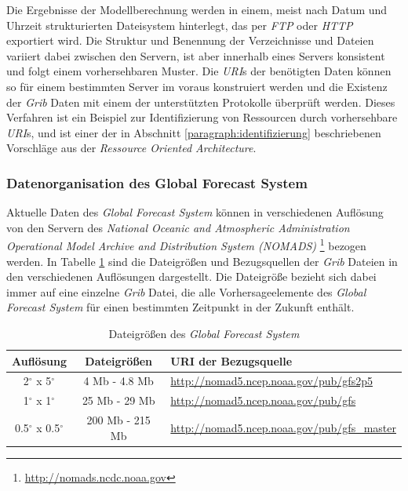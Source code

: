Die Ergebnisse der Modellberechnung werden in einem, meist nach Datum
und Uhrzeit strukturierten Dateisystem hinterlegt, das per
\textit{FTP} oder \textit{HTTP} exportiert wird. Die Struktur und
Benennung der Verzeichnisse und Dateien variiert dabei zwischen den
Servern, ist aber innerhalb eines Servers konsistent und folgt einem
vorhersehbaren Muster. Die \textit{URI}s der benötigten Daten können
so für einem bestimmten Server im voraus konstruiert werden und die
Existenz der \textit{Grib} Daten mit einem der unterstützten
Protokolle überprüft werden. Dieses Verfahren ist ein Beispiel zur
Identifizierung von Ressourcen durch vorhersehbare \textit{URI}s, und
ist einer der in Abschnitt \ref{paragraph:identifizierung}
beschriebenen Vorschläge aus der \textit{Ressource Oriented
  Architecture}.

\subsubsection{Datenorganisation des Global Forecast System}

Aktuelle Daten des \textit{Global Forecast System} können in
verschiedenen Auflösung von den Servern des \textit{National Oceanic
  and Atmospheric Administration Operational Model Archive and
  Distribution System (NOMADS)} 
\footnote{\url{http://nomads.ncdc.noaa.gov}} bezogen werden. In
Tabelle \ref{tab:gfs_auflösungen} sind die Dateigrößen und
Bezugsquellen der \textit{Grib} Dateien in den verschiedenen
Auflösungen dargestellt. Die Dateigröße bezieht sich dabei immer auf
eine einzelne \textit{Grib} Datei, die alle Vorhersageelemente des
\textit{Global Forecast System} für einen bestimmten Zeitpunkt in der
Zukunft enthält.

\begin{table}[h]
  \centering
  {\sf
    \footnotesize
    \begin{longtable}{@{}ccl}

      \toprule
      \textbf{Auflösung} & \textbf{Dateigrößen} & \textbf{URI der Bezugsquelle} \\

      \midrule

      2$^{\circ}$ x 5$^{\circ}$ & 4 Mb - 4.8 Mb & \url{http://nomad5.ncep.noaa.gov/pub/gfs2p5} \\
      1$^{\circ}$ x 1$^{\circ}$ & 25 Mb - 29 Mb & \url{http://nomad5.ncep.noaa.gov/pub/gfs} \\
      0.5$^{\circ}$ x 0.5$^{\circ}$ & 200 Mb - 215 Mb & \url{http://nomad5.ncep.noaa.gov/pub/gfs_master} \\

      \bottomrule

    \end{longtable}
  }

  \caption{Dateigrößen des \textit{Global Forecast System}}
  \label{tab:gfs_auflösungen}

\end{table}

